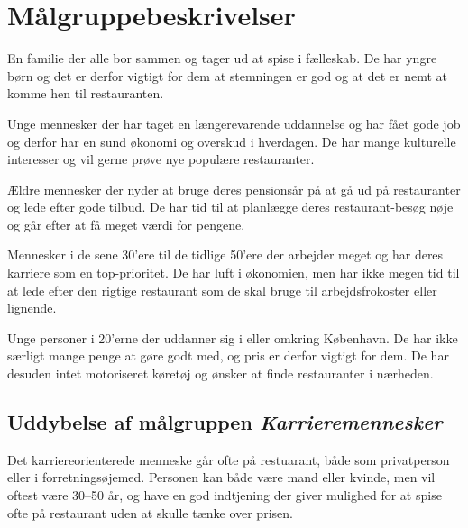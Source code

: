 \documentclass[a4paper, 12pt]{article}
\begin{document}
\section{Målgruppebeskrivelser}
\label{sec:Maalgruppebeskrivelser}

\begin{description}[style=nextline,font=\bf]
  \item[Familier med små børn]

    En familie der alle bor sammen og tager ud at spise i
    fælleskab. De har yngre børn og det er derfor vigtigt for dem at
    stemningen er god og at det er nemt at komme hen til restauranten.

  \item[25--30 årige storby-par uden børn]

    Unge mennesker der har taget en længerevarende uddannelse og har
    fået gode job og derfor har en sund økonomi og overskud i
    hverdagen. De har mange kulturelle interesser og vil gerne prøve
    nye populære restauranter.

  \item[Pensionister]

    Ældre mennesker der nyder at bruge deres pensionsår på at gå ud på
    restauranter og lede efter gode tilbud. De har tid til at
    planlægge deres restaurant-besøg nøje og går efter at få meget
    værdi for pengene.

  \item[Karrieremennesker]

    Mennesker i de sene 30'ere til de tidlige 50'ere der arbejder
    meget og har deres karriere som en top-prioritet. De har luft i
    økonomien, men har ikke megen tid til at lede efter den rigtige
    restaurant som de skal bruge til arbejdsfrokoster eller lignende.

  \item[Studerende]

    Unge personer i 20'erne der uddanner sig i eller omkring
    København. De har ikke særligt mange penge at gøre godt med, og
    pris er derfor vigtigt for dem. De har desuden intet motoriseret
    køretøj og ønsker at finde restauranter i nærheden.
\end{description}

\subsection{Uddybelse af målgruppen \emph{Karrieremennesker}}
Det karriereorienterede menneske går ofte på restuarant, både som privatperson
eller i forretningsøjemed. Personen kan både være mand eller kvinde, men vil
oftest være 30--50 år, og have en god indtjening der giver mulighed for at spise
ofte på restaurant uden at skulle tænke over prisen.
\end{document}
